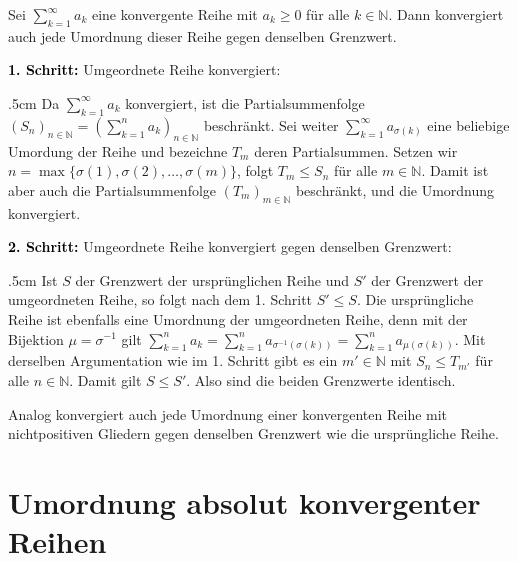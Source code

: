 \documentclass[fontsize=9pt,
               parskip=half-,
               DIV=14,
               listof=chapterentry,
               tocflat]{scrbook}
\newenvironment{indentblock}{\begin{adjustwidth}{.5cm}{}}{\end{adjustwidth}}
\newcommand{\proofstep}[1]{\textbf{\textcolor{Black}{#1}}}
\begin{document}
\begin{theorem*}
Sei $\sum _{k=1}^{\infty }a_{k}$ eine konvergente Reihe mit $a_{k}\geq 0$ für alle $k\in \mathbb {N} $. Dann konvergiert auch jede Umordnung dieser Reihe gegen denselben Grenzwert.

\end{theorem*}

\begin{proof*}
\proofstep{1. Schritt:}
 Umgeordnete Reihe konvergiert:\begin{indentblock}
Da $\sum _{k=1}^{\infty }a_{k}$ konvergiert, ist die Partialsummenfolge $(S_{n})_{n\in \mathbb {N} }=\left(\sum _{k=1}^{n}a_{k}\right)_{n\in \mathbb {N} }$ beschränkt. Sei weiter $\sum _{k=1}^{\infty }a_{\sigma (k)}$ eine beliebige Umordung der Reihe und bezeichne $T_{m}$ deren Partialsummen. Setzen wir $n=\max\{\sigma (1),\sigma (2),\ldots ,\sigma (m)\}$, folgt $T_{m}\leq S_{n}$ für alle $m\in \mathbb {N} $. Damit ist aber auch die Partialsummenfolge $(T_{m})_{m\in \mathbb {N} }$ beschränkt, und die Umordnung konvergiert.

\end{indentblock}

\proofstep{2. Schritt:}
 Umgeordnete Reihe konvergiert gegen denselben Grenzwert:\begin{indentblock}
Ist $S$ der Grenzwert der ursprünglichen Reihe und $S'$ der Grenzwert der umgeordneten Reihe, so folgt nach dem 1. Schritt $S'\leq S$. Die ursprüngliche Reihe ist ebenfalls eine Umordnung der umgeordneten Reihe, denn mit der Bijektion $\mu =\sigma ^{-1}$ gilt $\sum _{k=1}^{n}a_{k}=\sum _{k=1}^{n}a_{\sigma ^{-1}(\sigma (k))}=\sum _{k=1}^{n}a_{\mu (\sigma (k))}$. Mit derselben Argumentation wie im 1. Schritt gibt es ein $m'\in \mathbb {N} $ mit $S_{n}\leq T_{m'}$ für alle $n\in \mathbb {N} $. Damit gilt $S\leq S'$. Also sind die beiden Grenzwerte identisch.

\end{indentblock}

\end{proof*}

\begin{hint*}
Analog konvergiert auch jede Umordnung einer konvergenten Reihe mit nichtpositiven Gliedern gegen denselben Grenzwert wie die ursprüngliche Reihe.

\end{hint*}

\section{Umordnung absolut konvergenter Reihen}
\end{document}
